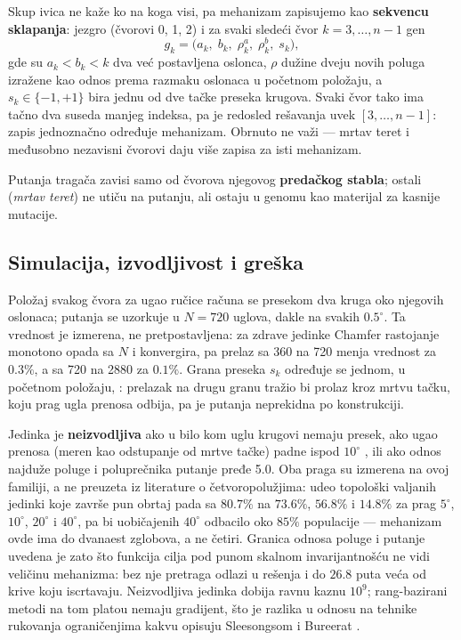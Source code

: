 \documentclass[
  conference,
  a4paper,
  10pt]{IEEEtran}
\begin{document}
Skup ivica ne kaže ko na koga visi, pa mehanizam zapisujemo kao
\textbf{sekvencu sklapanja}: jezgro (čvorovi 0, 1, 2) i za svaki sledeći
čvor \(k = 3,\dots,n-1\) gen \[
g_k = \big(a_k,\; b_k,\; \rho^a_k,\; \rho^b_k,\; s_k\big),
\] gde su \(a_k < b_k < k\) dva već postavljena oslonca, \(\rho\) dužine
dveju novih poluga izražene kao odnos prema razmaku oslonaca u početnom
položaju, a \(s_k \in \{-1,+1\}\) bira jednu od dve tačke preseka
krugova. Svaki čvor tako ima tačno dva suseda manjeg indeksa, pa je
redosled rešavanja uvek \([3,\dots,n-1]\): zapis jednoznačno određuje
mehanizam. Obrnuto ne važi --- mrtav teret i međusobno nezavisni čvorovi
daju više zapisa za isti mehanizam.

Putanja tragača zavisi samo od čvorova njegovog \textbf{predačkog
stabla}; ostali (\emph{mrtav teret}) ne utiču na putanju, ali ostaju u
genomu kao materijal za kasnije mutacije.

\hypertarget{simulacija-izvodljivost-i-greux161ka}{%
\subsection{Simulacija, izvodljivost i
greška}\label{simulacija-izvodljivost-i-greux161ka}}

Položaj svakog čvora za ugao ručice računa se presekom dva kruga oko
njegovih oslonaca; putanja se uzorkuje u \(N = 720\) uglova, dakle na
svakih \(0.5^\circ\). Ta vrednost je izmerena, ne pretpostavljena: za
zdrave jedinke Chamfer rastojanje monotono opada sa \(N\) i konvergira,
pa prelaz sa 360 na 720 menja vrednost za \(0.3\%\), a sa 720 na 2880 za
\(0.1\%\). Grana preseka \(s_k\) određuje se jednom, u početnom
položaju, : prelazak na drugu granu tražio bi prolaz kroz mrtvu tačku,
koju prag ugla prenosa odbija, pa je putanja neprekidna po konstrukciji.

Jedinka je \textbf{neizvodljiva} ako u bilo kom uglu krugovi nemaju
presek, ako ugao prenosa (meren kao odstupanje od mrtve tačke) padne
ispod \(10^\circ\) \citep{balli}, ili ako odnos najduže poluge i
poluprečnika putanje pređe 5.0. Oba praga su izmerena na ovoj familiji,
a ne preuzeta iz literature o četvoropolužjima: udeo topološki valjanih
jedinki koje završe pun obrtaj pada sa \(80.7\%\) na \(73.6\%\),
\(56.8\%\) i \(14.8\%\) za prag \(5^\circ\), \(10^\circ\), \(20^\circ\)
i \(40^\circ\), pa bi uobičajenih \(40^\circ\) odbacilo oko \(85\%\)
populacije --- mehanizam ovde ima do dvanaest zglobova, a ne četiri.
Granica odnosa poluge i putanje uvedena je zato što funkcija cilja pod
punom skalnom invarijantnošću ne vidi veličinu mehanizma: bez nje
pretraga odlazi u rešenja i do \(26.8\) puta veća od krive koju
iscrtavaju. Neizvodljiva jedinka dobija ravnu kaznu \(10^9\);
rang-bazirani metodi na tom platou nemaju gradijent, što je razlika u
odnosu na tehnike rukovanja ograničenjima kakvu opisuju Sleesongsom i
Bureerat \citep{sleesongsom}.
\end{document}
